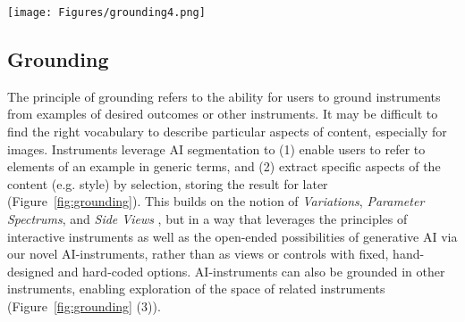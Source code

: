 \begin{figure*}[t]
    \centering
\texttt{[image: Figures/grounding4.png]}
\caption{Grounding an instrument such as a generative container with an example enables to refer to features to preserve or alter in simple worlds by leveraging AI segmentation (1). Grounding an instrument such as a fillable brush in a specific aspect of an example, for example by selecting a region and extracting its style (2), enables users to use and apply it to other inputs without the need to articulating it in words. The principle of grounding also applies to instruments themselves such as deriving fragments from an example one (3).}
    \label{fig:grounding}
\end{figure*}



\subsection{Grounding}

The principle of grounding refers to the ability for users to ground instruments from examples of desired outcomes or other instruments. It may be difficult to find the right vocabulary to describe particular aspects of content, especially for images. Instruments leverage AI segmentation to (1) enable users to refer to elements of an example in generic terms,  and (2) extract specific aspects of the content (e.g. style) by selection, storing the result for later (Figure~\ref{fig:grounding}). This builds on the notion of \textit{Variations}, \textit{Parameter Spectrums}, and \textit{Side Views} \cite{TechnologyProbesCHI2003, TerrySideViews2002}, but in a way that leverages the principles of interactive instruments \cite{beaudouin2000instrumental, beaudouin2000reification} as well as the open-ended possibilities of generative AI via our novel AI-instruments, rather than as views or controls with fixed, hand-designed and hard-coded options. AI-instruments can also be grounded in other instruments, enabling exploration of the space of related instruments (Figure~\ref{fig:grounding} (3)).

